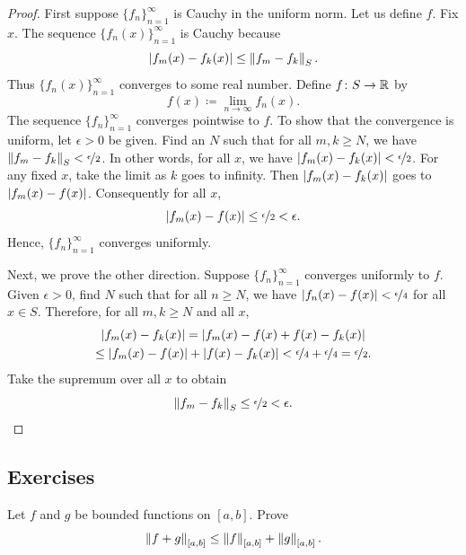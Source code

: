 \begin{proof}
First suppose $\{ f_n \}_{n=1}^\infty$ is Cauchy in the uniform norm.
Let us define $f$.  Fix $x$.
The sequence $\bigl\{ f_n(x) \bigr\}_{n=1}^\infty$ is Cauchy because
\begin{equation*}
\left\lvert {f_m(x)-f_k(x)} \right\rvert
\leq
\left\lVert {f_m-f_k} \right\rVert_S .
\end{equation*}
Thus $\bigl\{ f_n(x) \bigr\}_{n=1}^\infty$ converges to some real number.  Define $f \colon S
\to {\mathbb{R}}$ by
\begin{equation*}
f(x) \coloneqq \lim_{n \to \infty} f_n(x) .
\end{equation*}
The sequence
$\{ f_n \}_{n=1}^\infty$ converges pointwise to $f$.  To show that the convergence
is uniform, let $\epsilon > 0$ be given.  Find an $N$ such that
for all $m, k \geq N$, we have
$\left\lVert {f_m-f_k} \right\rVert_S < \nicefrac{\epsilon}{2}$.  In other words, for
all $x$, we have
$\left\lvert {f_m(x)-f_k(x)} \right\rvert < \nicefrac{\epsilon}{2}$.  For any fixed $x$, take the limit
as $k$ goes to infinity.  Then $\left\lvert {f_m(x)-f_k(x)} \right\rvert$
goes to $\left\lvert {f_m(x)-f(x)} \right\rvert$.
Consequently for all $x$,
\begin{equation*}
\left\lvert {f_m(x)-f(x)} \right\rvert \leq \nicefrac{\epsilon}{2} < \epsilon .
\end{equation*}
Hence, $\{ f_n \}_{n=1}^\infty$ converges uniformly.

Next, we prove the other direction.
Suppose $\{ f_n \}_{n=1}^\infty$ converges uniformly to
$f$.  Given $\epsilon > 0$, find $N$ such that for all $n \geq N$,
we have $\left\lvert {f_n(x)-f(x)} \right\rvert < \nicefrac{\epsilon}{4}$ for all $x \in S$.
Therefore, for all $m, k \geq N$ and all $x$,
\begin{multline*}
\left\lvert {f_m(x)-f_k(x)} \right\rvert = 
\left\lvert {f_m(x)-f(x)+f(x)-f_k(x)} \right\rvert
\\
\leq
\left\lvert {f_m(x)-f(x)} \right\rvert+\left\lvert {f(x)-f_k(x)} \right\rvert < \nicefrac{\epsilon}{4} +
\nicefrac{\epsilon}{4} = \nicefrac{\epsilon}{2} .
\end{multline*}
Take the supremum over all $x$ to obtain
\begin{equation*}
\left\lVert {f_m-f_k} \right\rVert_S \leq \nicefrac{\epsilon}{2} < \epsilon .  \qedhere
\end{equation*}
\end{proof}

\subsection{Exercises}

\begin{exercise}
Let $f$ and $g$ be bounded functions on $[a,b]$.  Prove 
\begin{equation*}
\left\lVert {f+g} \right\rVert_{[a,b]} \leq \left\lVert {f} \right\rVert_{[a,b]} + \left\lVert {g} \right\rVert_{[a,b]} .
\end{equation*}
\end{exercise}


